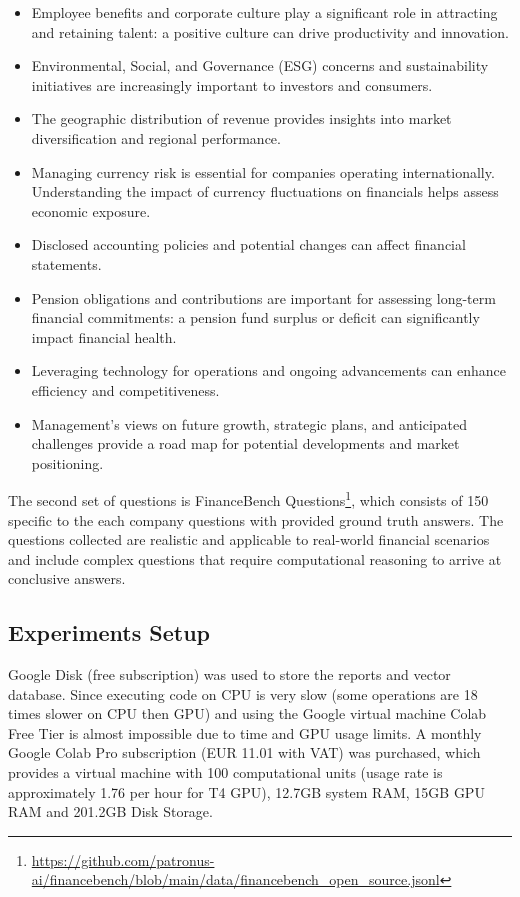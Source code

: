 \begin{enumerate}
\begin{itemize}
    \item Employee benefits and corporate culture play a significant role in attracting and retaining talent: a positive culture can drive productivity and innovation.
    \item Environmental, Social, and Governance (ESG) concerns and sustainability initiatives are increasingly important to investors and consumers.
    \item The geographic distribution of revenue provides insights into market diversification and regional performance.
    \item Managing currency risk is essential for companies operating internationally. Understanding the impact of currency fluctuations on financials helps assess economic exposure.
    \item Disclosed accounting policies and potential changes can affect financial statements.
    \item Pension obligations and contributions are important for assessing long-term financial commitments: a pension fund surplus or deficit can significantly impact financial health.
    \item Leveraging technology for operations and ongoing advancements can enhance efficiency and competitiveness.
    \item Management’s views on future growth, strategic plans, and anticipated challenges provide a road map for potential developments and market positioning.
\end{itemize}
\end{enumerate}

The second set of questions is FinanceBench Questions\footnote{\url{https://github.com/patronus-ai/financebench/blob/main/data/financebench_open_source.jsonl}}, which consists of 150 specific to the each company questions with provided ground truth answers. The questions collected are realistic and applicable to real-world financial scenarios and include complex questions that require computational reasoning to arrive at conclusive answers.


\subsection{Experiments Setup}
Google Disk (free subscription) was used to store the reports and vector database. Since executing code on CPU is very slow (some operations are 18 times slower on CPU then GPU) and using the Google virtual machine Colab Free Tier is almost impossible due to time and GPU usage limits. A monthly Google Colab Pro subscription (EUR 11.01 with VAT) was purchased, which provides a virtual machine with 100 computational units (usage rate is approximately 1.76 per hour for T4 GPU), 12.7GB system RAM, 15GB GPU RAM and 201.2GB Disk Storage.

